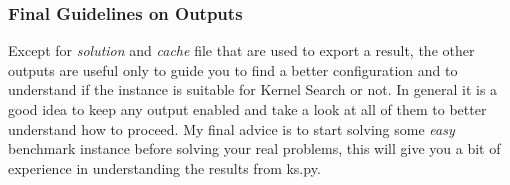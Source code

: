     
    \subsubsection{Final Guidelines on Outputs}
        Except for \emph{solution} and \emph{cache} file that are used to export a result, the other outputs are useful only to guide you to find a 
        better configuration and to understand if the instance is suitable for Kernel Search or not. In general it is a good idea to keep any output 
        enabled and take a look at all of them to better understand how to proceed. 
        My final advice is to start solving some \emph{easy} benchmark instance before solving your real problems, this will give you a bit of experience 
        in understanding the results from ks.py. 













    






        


    

